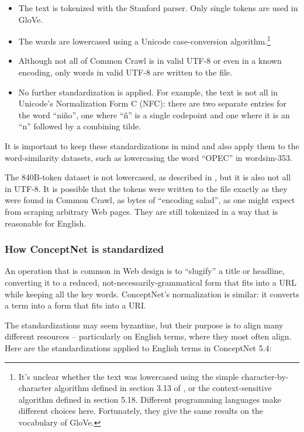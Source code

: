 \documentclass[letterpaper]{article}
\begin{document}
\begin{itemize}
\item The text is tokenized with the Stanford parser. Only single tokens are
    used in GloVe.
\item The words are lowercased using a Unicode case-conversion
    algorithm.\footnote{
        It's unclear whether the text was lowercased using the simple
        character-by-character algorithm defined in section 3.13 of
        \cite{unicode2014}, or the context-sensitive algorithm defined in section
        5.18. Different programming languages make different choices here.
        Fortunately, they give the same results on the vocabulary of GloVe.
}
\item Although not all of Common Crawl is in valid UTF-8 or even in a known
    encoding, only words in valid UTF-8 are written to the file.
\item No further standardization is applied. For example, the text is not all
    in Unicode's Normalization Form C (NFC): there are two separate entries
    for the word ``ni\~{n}o'', one where ``\~{n}'' is a single codepoint and
    one where it is an ``n'' followed by a combining tilde.
\end{itemize}

It is important to keep these standardizations in mind and also apply them to
the word-similarity datasets, such as lowercasing the word ``OPEC'' in {\sc
wordsim-353}.

The 840B-token dataset is not lowercased, as described in
\cite{pennington2014glove}, but it is also not all in UTF-8. It is possible
that the tokens were written to the file exactly as they were found in
Common Crawl, as bytes of ``encoding salad'', as one might expect from
scraping arbitrary Web pages. They are still tokenized in a way that is
reasonable for English.

\subsubsection{How ConceptNet is standardized}

An operation that is common in Web design is to ``slugify'' a title or
headline, converting it to a reduced, not-necessarily-grammatical form
that fits into a URL while keeping all the key words. ConceptNet's
normalization is similar: it converts a term into a form that fits into
a URI.

The standardizations may seem byzantine, but their purpose is to align many
different resources -- particularly on English terms, where they most often
align. Here are the standardizations applied to English terms in ConceptNet
5.4:
\end{document}
